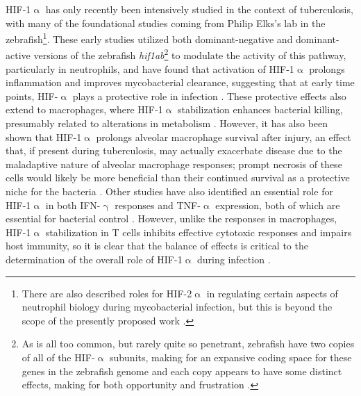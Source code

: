 HIF-1$\upalpha$ has only recently been intensively studied in the context of tuberculosis, with many of the foundational studies coming from Philip Elks's lab in the zebrafish\footnote{There are also described roles for HIF\hyp{}2$\upalpha$ in regulating certain aspects of neutrophil biology during mycobacterial infection, but this is beyond the scope of the presently proposed work \citep{Thompson2014, Elks2015}.}. These early studies utilized both dominant\hyp{}negative and dominant\hyp{}active versions of the zebrafish \textit{hif1ab}\footnote{As is all too common, but rarely quite so penetrant, zebrafish have two copies of all of the HIF\hyp{}$\upalpha$ subunits, making for an expansive coding space for these genes in the zebrafish genome and each copy appears to have some distinct effects, making for both opportunity and frustration \citep{Elks2015}.} to modulate the activity of this pathway, particularly in neutrophils, and have found that activation of HIF\hyp{}1$\upalpha$ prolongs inflammation and improves mycobacterial clearance, suggesting that at early time points, HIF\hyp{}$\upalpha$ plays a protective role in infection \citep{Elks2011, Elks2013, Hammond2020}. These protective effects also extend to macrophages, where HIF-1$\upalpha$ stabilization enhances bacterial killing, presumably related to alterations in metabolism \citep{Knight2018, Zenk2021}. However, it has also been shown that HIF-1$\upalpha$ prolongs alveolar macrophage survival after injury, an effect that, if present during tuberculosis, may actually exacerbate disease due to the maladaptive nature of alveolar macrophage responses; prompt necrosis of these cells would likely be more beneficial than their continued survival as a protective niche for the bacteria \citep{Woods2022, Leemans2001}. Other studies have also identified an essential role for HIF-1$\upalpha$ in both IFN-$\upgamma$ responses and TNF-$\upalpha$ expression, both of which are essential for bacterial control \citep{Braverman2016, Lewis2019, Flynn1993, Flynn1995}. However, unlike the responses in macrophages, HIF-1$\upalpha$ stabilization in T cells inhibits effective cytotoxic responses and impairs host immunity, so it is clear that the balance of effects is critical to the determination of the overall role of HIF-1$\upalpha$ during infection \citep{Liu2022b}.

